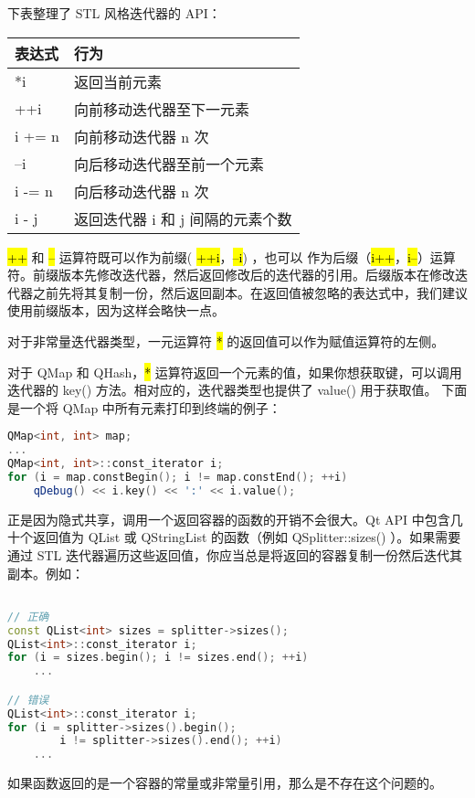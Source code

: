 下表整理了 STL 风格迭代器的 API：

\begin{tabular}{|l|l|}
\hline
表达式	&行为\\
\hline
*i&	返回当前元素\\
\hline
++i&	向前移动迭代器至下一元素\\
\hline
i += n&	向前移动迭代器 n 次\\
\hline
--i	&向后移动迭代器至前一个元素\\
\hline
i -= n&	向后移动迭代器 n 次\\
\hline
i - j&	返回迭代器 i 和 j 间隔的元素个数\\
\hline
\end{tabular}

\hl{++} 和 \hl{--} 运算符既可以作为前缀( \hl{++i}，\hl{--i}) ，也可以
作为后缀（\hl{i++}，\hl{i--}）运算符。前缀版本先修改迭代器，然后返回修改后的迭代器的引用。后缀版本在修改迭代器之前先将其复制一份，然后返回副本。在返回值被忽略的表达式中，我们建议使用前缀版本，因为这样会略快一点。

对于非常量迭代器类型，一元运算符 \hl{*} 的返回值可以作为赋值运算符的左侧。

对于 QMap 和 QHash，\hl{*} 运算符返回一个元素的值，如果你想获取键，可以调用
迭代器的 key() 方法。相对应的，迭代器类型也提供了 value() 用于获取值。
下面是一个将 QMap 中所有元素打印到终端的例子：


\begin{lstlisting}[language=C++]
QMap<int, int> map;
...
QMap<int, int>::const_iterator i;
for (i = map.constBegin(); i != map.constEnd(); ++i)
    qDebug() << i.key() << ':' << i.value();
\end{lstlisting}

正是因为隐式共享，调用一个返回容器的函数的开销不会很大。Qt API 中包含几十个返回值为 QList 或 QStringList 的函数（例如 QSplitter::sizes() ）。如果需要通过 STL 迭代器遍历这些返回值，你应当总是将返回的容器复制一份然后迭代其副本。例如：

\begin{lstlisting}[language=C++]

// 正确
const QList<int> sizes = splitter->sizes();
QList<int>::const_iterator i;
for (i = sizes.begin(); i != sizes.end(); ++i)
    ...

// 错误
QList<int>::const_iterator i;
for (i = splitter->sizes().begin();
        i != splitter->sizes().end(); ++i)
    ...
\end{lstlisting}

如果函数返回的是一个容器的常量或非常量引用，那么是不存在这个问题的。

